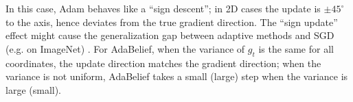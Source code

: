 \documentclass{article}
\newtheorem{theorem}{Theorem}[section]
\begin{document}
In this case, Adam behaves like a ``sign descent''; in 2D cases the update is $\pm 45^{\circ}$ to the axis, hence deviates from the true gradient direction. 
The ``sign update'' effect might cause the generalization gap between adaptive methods and SGD (e.g. on ImageNet) \cite{bernstein2018signsgd, wilson2017marginal}.
For AdaBelief, when the variance of $g_t$ is the same for all coordinates, the update direction matches the gradient direction; when the variance is not uniform, AdaBelief takes a small (large) step when the variance is large (small). 

\end{document}
